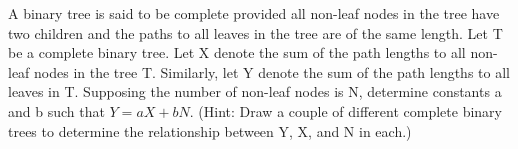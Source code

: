 A binary tree is said to be complete provided all non-leaf nodes in the tree
have two children and the paths to all leaves in the tree are of the same
length.
Let T be a complete binary tree.  Let X denote the sum of the path lengths to
all non-leaf nodes in the tree T.  Similarly, let Y denote the sum of the
path lengths to all leaves in T.  Supposing the number of non-leaf nodes is N,
determine constants a and b such that $Y=aX+bN$. (Hint: Draw a couple of
different complete binary trees to determine the relationship between
Y, X, and N in each.)
